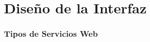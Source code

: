 \chapter{Diseño de la Interfaz}
\label{cap:disenioInterfaz}




\subsection{Tipos de Servicios Web}
\label{cap:subsec:tiposserviciosweb}